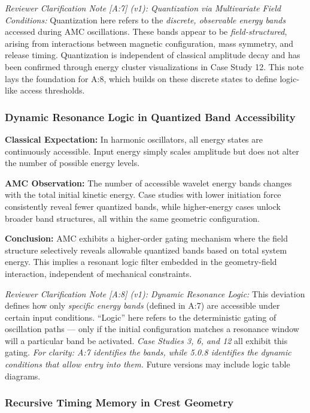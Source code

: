 \documentclass[10pt,aps,pre,onecolumn,superscriptaddress,notitlepage]{revtex4-2}
\begin{document}
\noindent \textit{Reviewer Clarification Note [A:7] (v1): Quantization via Multivariate Field Conditions:} Quantization here refers to the \textit{discrete, observable energy bands} accessed during AMC oscillations. These bands appear to be \textit{field-structured}, arising from interactions between magnetic configuration, mass symmetry, and release timing. Quantization is independent of classical amplitude decay and has been confirmed through energy cluster visualizations in Case Study 12. This note lays the foundation for A:8, which builds on these discrete states to define logic-like access thresholds.

\subsubsection{Dynamic Resonance Logic in Quantized Band Accessibility}
\label{sec:dev8DynamicResonance}


\textbf{Classical Expectation:} In harmonic oscillators, all energy states are continuously accessible. Input energy simply scales amplitude but does not alter the number of possible energy levels.

\textbf{AMC Observation:} The number of accessible wavelet energy bands changes with the total initial kinetic energy. Case studies with lower initiation force consistently reveal fewer quantized bands, while higher-energy cases unlock broader band structures, all within the same geometric configuration.

\textbf{Conclusion:} AMC exhibits a higher-order gating mechanism where the field structure selectively reveals allowable quantized bands based on total system energy. This implies a resonant logic filter embedded in the geometry-field interaction, independent of mechanical constraints.

\noindent \textit{Reviewer Clarification Note [A:8] (v1): Dynamic Resonance Logic:} This deviation defines how only \textit{specific energy bands} (defined in A:7) are accessible under certain input conditions. “Logic” here refers to the deterministic gating of oscillation paths — only if the initial configuration matches a resonance window will a particular band be activated. \textit{Case Studies 3, 6, and 12} all exhibit this gating. \textit{For clarity: A:7 identifies the bands, while 5.0.8 identifies the dynamic conditions that allow entry into them.} Future versions may include logic table diagrams.

\subsubsection{Recursive Timing Memory in Crest Geometry}
\label{sec:dev9RecursiveTiming}
\end{document}
